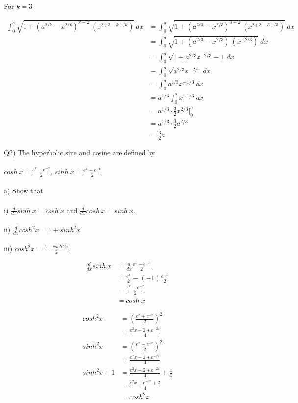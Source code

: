 \documentclass[9pt]{article}
\begin{document}
For $k = 3$

\begin{align*}
  \int_{0}^{a} \sqrt{1 + (a^{2/k} - x^{2/k})^{k - 2} \ (x^{2(2 - k)/k})} \ dx &= \int_{0}^{a} \sqrt{1 + (a^{2/3} - x^{2/3})^{3 - 2} \ (x^{2(2 - 3)/3})} \ dx \\
  &= \int_{0}^{a} \sqrt{1 + (a^{2/3} - x^{2/3}) \ (x^{-2/3})} \ dx \\
  &= \int_{0}^{a} \sqrt{1 + a^{2/3}x^{-2/3} - 1} \ dx \\
  &= \int_{0}^{a} \sqrt{a^{2/3}x^{-2/3}} \ dx \\
  &= \int_{0}^{a} a^{1/3}x^{-1/3} \ dx \\
  &= a^{1/3} \int_{0}^{a} x^{-1/3} \ dx \\
  &= a^{1/3} \cdot \frac{3}{2} x^{2/3} \bigg]_{0}^{a} \\
  &= a^{1/3} \cdot \frac{3}{2} a^{2/3} \\
  &= \frac{3}{2} a
\end{align*}


\begin{tcolorbox}
  Q2) The hyperbolic sine and cosine are defined by \\
  \\
  $cosh \ x = \frac{e^x + e^{-x}}{2}$, $sinh \ x = \frac{e^x - e^{-x}}{2}$ \\
  \\
  a) Show that \\
  \\
  i) $\frac{d}{dx}sinh \ x = cosh \ x$ and $\frac{d}{dx}cosh \ x = sinh \ x$. \\
  \\
  ii) $\frac{d}{dx}cosh^2 x = 1 + sinh^2 x$ \\
  \\
  iii) $cosh^2 x = \frac{1 + cosh \ 2x}{2}$.
\end{tcolorbox}

\begin{align*}
  \frac{d}{dx}sinh \ x &= \frac{d}{dx} \frac{e^x - e^{-x}}{2} \\
  &= \frac{e^x}{2} - (-1) \frac{e^{-x}}{2} \\
  &= \frac{e^x + e^{-x}}{2} \\
  &= cosh \ x
\end{align*}

\begin{align*}
  cosh^2 x &= (\frac{e^x + e^{-x}}{2})^2 \\
  &= \frac{e^2x + 2 + e^{-2x}}{4} \\
  sinh^2 x &= (\frac{e^x - e^{-x}}{2})^2 \\
  &= \frac{e^2x - 2 + e^{-2x}}{4} \\
  sinh^2 x + 1 &= \frac{e^2x - 2 + e^{-2x}}{4} + \frac{4}{4} \\
  &= \frac{e^2x + e^{-2x} + 2}{4} \\
  &= cosh^2 x
\end{align*}
\end{document}
